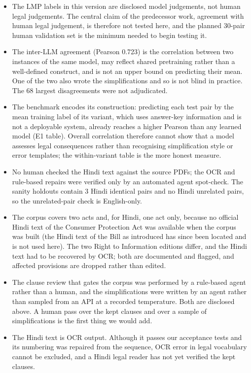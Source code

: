 \documentclass[conference]{IEEEtran}
\begin{document}
\begin{itemize}
\item The LMP labels in this version are disclosed model judgements, not human legal judgements. The central claim of the predecessor work, agreement with human legal judgement, is therefore not tested here, and the planned 30-pair human validation set is the minimum needed to begin testing it.
\item The inter-LLM agreement (Pearson 0.723) is the correlation between two instances of the same model, may reflect shared pretraining rather than a well-defined construct, and is not an upper bound on predicting their mean. One of the two also wrote the simplifications and so is not blind in practice. The 68 largest disagreements were not adjudicated.
\item The benchmark encodes its construction: predicting each test pair by the mean training label of its variant, which uses answer-key information and is not a deployable system, already reaches a higher Pearson than any learned model (E1 table). Overall correlation therefore cannot show that a model assesses legal consequences rather than recognising simplification style or error templates; the within-variant table is the more honest measure.
\item No human checked the Hindi text against the source PDFs; the OCR and rule-based repairs were verified only by an automated agent spot-check. The sanity holdouts contain 3 Hindi identical pairs and no Hindi unrelated pairs, so the unrelated-pair check is English-only.
\item The corpus covers two acts and, for Hindi, one act only, because no official Hindi text of the Consumer Protection Act was available when the corpus was built (the Hindi text of the Bill as introduced has since been located and is not used here). The two Right to Information editions differ, and the Hindi text had to be recovered by OCR; both are documented and flagged, and affected provisions are dropped rather than edited.
\item The clause review that gates the corpus was performed by a rule-based agent rather than a human, and the simplifications were written by an agent rather than sampled from an API at a recorded temperature. Both are disclosed above. A human pass over the kept clauses and over a sample of simplifications is the first thing we would add.
\item The Hindi text is OCR output. Although it passes our acceptance tests and its numbering was repaired from the sequence, OCR error in legal vocabulary cannot be excluded, and a Hindi legal reader has not yet verified the kept clauses.

\end{itemize}
\end{document}
